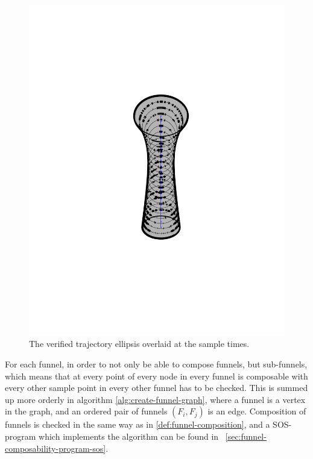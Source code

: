 \begin{figure}
\begin{minipage}[b]{0.4\textwidth}
    \includegraphics[width=\textwidth]{figures/method/funnel-sampled}
    \caption{The verified trajectory ellipsis overlaid at the sample times.}
  \end{minipage}
\end{figure}

For each funnel, in order to not only be able to compose funnels, but
sub-funnels, which means that at every point of every node in every funnel is
composable with every other sample point in every other funnel has to be
checked. This is summed up more orderly in algorithm
\cref{alg:create-funnel-graph}, where a funnel is a vertex in the graph, and an
ordered pair of funnels \(\left( F_{i}, F_{j} \right)\) is an edge. Composition
of funnels is checked in the same way as in \cref{def:funnel-composition}, and a
\ac{SOS}-program which implements the algorithm can be found in
~\cref{sec:funnel-composability-program-sos}.


